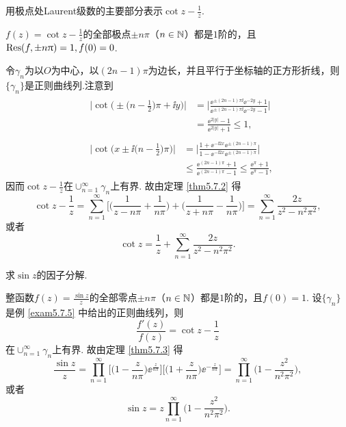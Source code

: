\begin{example}\label{exam5.7.5}
用极点处Laurent级数的主要部分表示$\cot z-\frac1z$.
\end{example}
\begin{solution}
$f(z)=\cot z-\frac1z$的全部极点$\pm n\pi$（$n\in\mathbb N$）都是$1$阶的，且$\operatorname*{Res}(f,\pm n\uppi)=1,f(0)=0$.

令$\gamma_n$为以$O$为中心，以$(2n-1)\pi$为边长，并且平行于坐标轴的正方形折线，则$\{\gamma_n\}$是正则曲线列.注意到
\begin{align*}
&\begin{aligned}
\bigg|\cot\bigg(\pm\bigg(n-\frac12\bigg)\pi+\ii y\bigg)\bigg|
&=\bigg|\frac{\ee^{\pm(2n-1)\pi\ii}\ee^{-2y}+1}
{\ee^{\pm(2n-1)\pi\ii}\ee^{-2y}-1}\bigg|\\
&=\frac{\ee^{2|y|}-1}{\ee^{2|y|}+1}\le1,
\end{aligned}\\
&\begin{aligned}
\bigg|\cot\bigg(x\pm\ii\bigg(n-\frac12\bigg)\pi\bigg)\bigg|
&=\bigg|\frac{1+\ee^{-\ii2x}\ee^{\pm(2n-1)\pi}}{1-\ee^{-\ii2x}\ee^{\pm(2n-1)\pi}}\bigg|\\
&\le\frac{\ee^{(2n-1)\pi}+1}{\ee^{(2n-1)\pi}-1}\le\frac{\ee^\pi+1}{\ee^\pi-1},
\end{aligned}
\end{align*}
因而$\cot z-\frac1z$在$\operatorname*{\cup}_{n=1}^\infty\gamma_n$上有界. 故由定理 \ref{thm5.7.2} 得
\[
\cot z-\frac1z=\sum_{n=1}^\infty\bigg[\bigg(\frac1{z-n\pi}+\frac1{n\pi}\bigg)+
\bigg(\frac1{z+n\pi}-\frac1{n\pi}\bigg)\bigg]
=\sum_{n=1}^\infty\frac{2z}{z^2-n^2\pi^2},
\]
或者
\begin{equation*}
\cot z=\frac1z+\sum_{n=1}^\infty\frac{2z}{z^2-n^2\pi^2}.
\end{equation*}
\end{solution}

\begin{example}
求$\sin z$的因子分解.
\end{example}
\begin{solution}
整函数$f(z)=\frac{\sin z}z$的全部零点$\pm n\pi$（$n\in\mathbb N$）都是$1$阶的，且$f(0)=1$. 设$\{\gamma_n\}$是例 \ref{exam5.7.5} 中给出的正则曲线列，则
\[\frac{f'(z)}{f(z)}=\cot z-\frac1z\]
在$\operatorname*{\cup}_{n=1}^\infty\gamma_n$上有界. 故由定理 \ref{thm5.7.3} 得
\[\frac{\sin z}z=\prod_{n=1}^\infty\bigg[\bigg(1-\frac z{n\pi}\bigg)\ee^{
\frac z{n\pi}}\bigg]\bigg[\bigg(1+\frac z{n\pi}\bigg)\ee^{-\frac z{n\pi}}\bigg]
=\prod_{n=1}^\infty\bigg(1-\frac{z^2}{n^2\pi^2}\bigg),\]
或者
\begin{equation*}
\sin z=z\prod_{n=1}^\infty\bigg(1-\frac{z^2}{n^2\pi^2}\bigg).
\end{equation*}
\end{solution}

